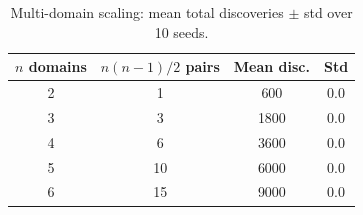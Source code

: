 \begin{table}[t]
\centering
\caption{Multi-domain scaling: mean total discoveries $\pm$ std over 10 seeds.}
\label{tab:exp3}
\begin{tabular}{cccc}
\toprule
$n$ domains & $n(n-1)/2$ pairs & Mean disc. & Std \\
\midrule
2 & 1 & 600 & 0.0 \\
3 & 3 & 1800 & 0.0 \\
4 & 6 & 3600 & 0.0 \\
5 & 10 & 6000 & 0.0 \\
6 & 15 & 9000 & 0.0 \\
\bottomrule
\end{tabular}
\end{table}
